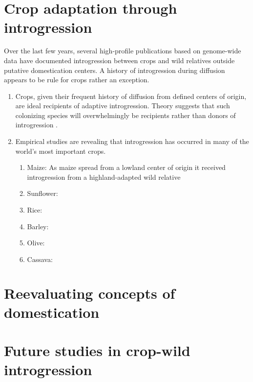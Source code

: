 \documentclass[11pt]{article}
\begin{document}
\section*{Crop adaptation through introgression}
Over the last few years, several high-profile publications based on genome-wide data have documented introgression between crops and wild relatives outside putative domestication centers. A history of introgression during diffusion appears to be rule for crops rather an exception.
\begin{enumerate}
	\item{Crops, given their frequent history of diffusion from defined centers of origin, are ideal recipients of adaptive introgression. Theory suggests that such colonizing species will overwhelmingly be recipients rather than donors of introgression \cite{Currat2008}.}
	\item{Empirical studies are revealing that introgression has occurred in many of the world's most important crops.}
	\begin{enumerate}
		\item{Maize: As maize spread from a lowland center of origin it received introgression from a highland-adapted wild relative \cite{Hufford2013}}
		\item{Sunflower: \cite{Baute2015}}
		\item{Rice: \cite{Huang2012}}
		\item{Barley: \cite{Poets2015}}
		\item{Olive: \cite{Diez2015}}
		\item{Cassava: \cite{Bredeson2016}}
	\end{enumerate}
\end{enumerate}

\section*{Reevaluating concepts of domestication}

\section*{Future studies in crop-wild introgression}


\end{document}
